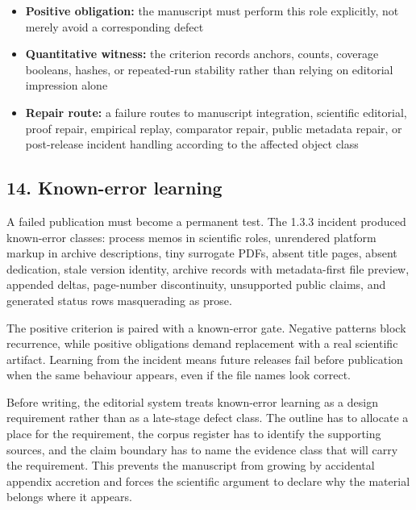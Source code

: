 \begin{itemize}[leftmargin=1.8em]

\item \textbf{Positive obligation:} the manuscript must perform this role explicitly, not merely avoid a corresponding defect

\item \textbf{Quantitative witness:} the criterion records anchors, counts, coverage booleans, hashes, or repeated-run stability rather than relying on editorial impression alone

\item \textbf{Repair route:} a failure routes to manuscript integration, scientific editorial, proof repair, empirical replay, comparator repair, public metadata repair, or post-release incident handling according to the affected object class

\end{itemize}

\subsection{14. Known-error learning}

A failed publication must become a permanent test. The 1.3.3 incident produced known-error classes: process memos in scientific roles, unrendered platform markup in archive descriptions, tiny surrogate PDFs, absent title pages, absent dedication, stale version identity, archive records with metadata-first file preview, appended deltas, page-number discontinuity, unsupported public claims, and generated status rows masquerading as prose.


The positive criterion is paired with a known-error gate. Negative patterns block recurrence, while positive obligations demand replacement with a real scientific artifact. Learning from the incident means future releases fail before publication when the same behaviour appears, even if the file names look correct.


Before writing, the editorial system treats known-error learning as a design requirement rather than as a late-stage defect class. The outline has to allocate a place for the requirement, the corpus register has to identify the supporting sources, and the claim boundary has to name the evidence class that will carry the requirement. This prevents the manuscript from growing by accidental appendix accretion and forces the scientific argument to declare why the material belongs where it appears.


